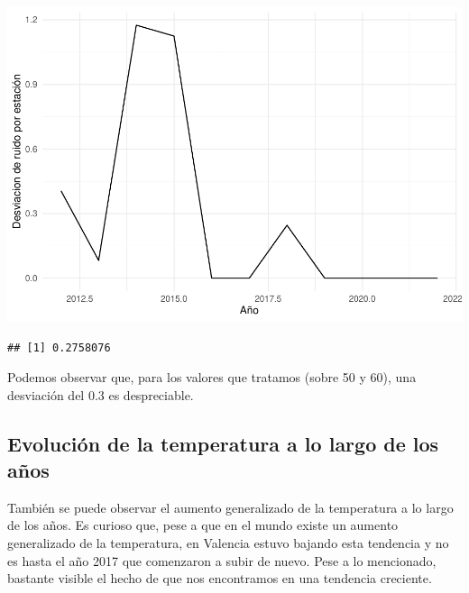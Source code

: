 \documentclass[notspecified,article,submit,moreauthors,pdftex]{Definitions/mdpi}
\newenvironment{Shaded}{\begin{snugshade}}{\end{snugshade}}
\newcommand{\FunctionTok}[1]{\textcolor[rgb]{0.13,0.29,0.53}{\textbf{#1}}}
\newcommand{\NormalTok}[1]{#1}
\newcommand{\SpecialCharTok}[1]{\textcolor[rgb]{0.81,0.36,0.00}{\textbf{#1}}}
\begin{document}
\includegraphics{ProyectoAED2023_plantilla_files/figure-latex/unnamed-chunk-30-1.pdf}

\begin{Shaded}
\end{Shaded}

\begin{verbatim}
## [1] 0.2758076
\end{verbatim}

Podemos observar que, para los valores que tratamos (sobre 50 y 60), una
desviación del 0.3 es despreciable.

\hypertarget{evoluciuxf3n-de-la-temperatura-a-lo-largo-de-los-auxf1os}{%
\subsection{Evolución de la temperatura a lo largo de los
años}\label{evoluciuxf3n-de-la-temperatura-a-lo-largo-de-los-auxf1os}}

También se puede observar el aumento generalizado de la temperatura a lo
largo de los años. Es curioso que, pese a que en el mundo existe un
aumento generalizado de la temperatura, en Valencia estuvo bajando esta
tendencia y no es hasta el año 2017 que comenzaron a subir de nuevo.
Pese a lo mencionado, bastante visible el hecho de que nos encontramos
en una tendencia creciente.
\end{document}
